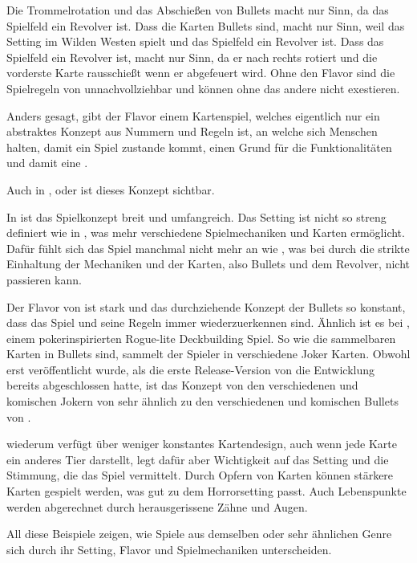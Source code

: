 Die Trommelrotation und das Abschießen von Bullets macht nur Sinn, da das Spielfeld ein Revolver ist.
Dass die Karten Bullets sind, macht nur Sinn, weil das Setting im Wilden Westen spielt und das Spielfeld ein Revolver ist.
Dass das Spielfeld ein Revolver ist, macht nur Sinn, da er nach rechts rotiert und die vorderste Karte rausschießt wenn er abgefeuert wird.
Ohne den Flavor sind die Spielregeln von \FF unnachvollziehbar und können ohne das andere nicht exestieren.


Anders gesagt, gibt der Flavor einem Kartenspiel, welches eigentlich nur ein abstraktes Konzept aus Nummern und Regeln ist,
an welche sich Menschen halten, damit ein Spiel zustande kommt, einen Grund für die Funktionalitäten und damit eine .


Auch in ,  oder  ist dieses Konzept sichtbar.

In 
ist das Spielkonzept breit und umfangreich.
Das Setting ist nicht so streng definiert wie in \FF, was mehr verschiedene Spielmechaniken und Karten ermöglicht.
Dafür fühlt sich das Spiel manchmal nicht mehr an wie ,
was bei \FF durch die strikte Einhaltung der Mechaniken und der Karten, also Bullets und dem Revolver, nicht passieren kann.


Der Flavor von \FF ist stark und das durchziehende Konzept der Bullets so konstant, dass das Spiel und seine Regeln immer
wiederzuerkennen sind. Ähnlich ist es bei , einem pokerinspirierten Rogue-lite Deckbuilding Spiel.
So wie die sammelbaren Karten in \FF Bullets sind, sammelt der Spieler in  verschiedene Joker Karten.
Obwohl  erst veröffentlicht wurde, als die erste Release-Version von \FF die Entwicklung bereits abgeschlossen hatte,
ist das Konzept von den verschiedenen und komischen Jokern von  sehr ähnlich zu den verschiedenen und
komischen Bullets von \FF. 


 wiederum verfügt über weniger konstantes Kartendesign, auch wenn jede Karte ein anderes Tier darstellt,
legt dafür aber Wichtigkeit auf das Setting und die Stimmung, die das Spiel vermittelt. Durch Opfern von Karten können stärkere Karten
gespielt werden, was gut zu dem Horrorsetting passt. Auch Lebenspunkte werden abgerechnet durch herausgerissene Zähne und Augen.


All diese Beispiele zeigen, wie Spiele aus demselben oder sehr ähnlichen Genre sich durch ihr Setting, Flavor und Spielmechaniken unterscheiden.


